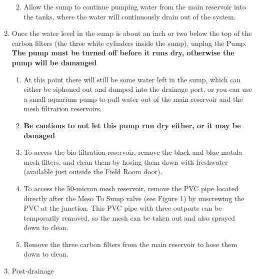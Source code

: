 \documentclass[]{book}
\providecommand{\tightlist}{%
  \setlength{\itemsep}{0pt}\setlength{\parskip}{0pt}}
\begin{document}
\begin{enumerate}
  \begin{enumerate}
  \def\labelenumii{\arabic{enumii}.}
  \tightlist
  \item
    Allow the sump to continue pumping water from the main reservoir
    into the tanks, where the water will continuously drain out of the
    system.
  \end{enumerate}
\item
  Once the water level in the sump is about an inch or two below the top
  of the carbon filters (the three white cylinders inside the sump),
  unplug the Pump. \textbf{The pump must be turned off before it runs
  dry, otherwise the pump will be damanged}

  \begin{enumerate}
  \def\labelenumii{\arabic{enumii}.}
  \tightlist
  \item
    At this point there will still be some water left in the sump, which
    can either be siphoned out and dumped into the drainage port, or you
    can use a small aquarium pump to pull water out of the main
    reservoir and the mesh filtration reservoirs.
  \item
    \textbf{Be cautious to not let this pump run dry either, or it may
    be damaged}
  \item
    To access the bio-filtration reservoir, remove the black and blue
    matala mesh filters, and clean them by hosing them down with
    freshwater (available just outside the Field Room door).
  \item
    To access the 50-micron mesh reservoir, remove the PVC pipe located
    directly after the Meso To Sump valve (see Figure 1) by unscrewing
    the PVC at the junction. This PVC pipe with three outports can be
    temporarily removed, so the mesh can be taken out and also sprayed
    down to clean.
  \item
    Remove the three carbon filters from the main reservoir to hose them
    down to clean.
  \end{enumerate}
\item
  Post-drainage


\end{enumerate}
\end{document}
